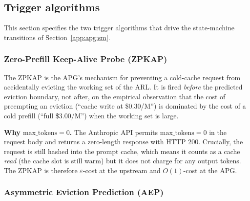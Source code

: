 \subsection{Trigger algorithms}
\label{app:apg:triggers}

This section specifies the two trigger algorithms that drive the
state-machine transitions of Section~\ref{app:apg:sm}.

\subsubsection{Zero-Prefill Keep-Alive Probe (ZPKAP)}
\label{app:apg:zpkap}

The ZPKAP is the APG's mechanism for preventing a cold-cache request
from accidentally evicting the working set of the ARL. It is fired
\emph{before} the predicted eviction boundary, not after, on the
empirical observation that the cost of preempting an eviction
(``cache write at \$0.30/M'') is dominated by the cost of a cold
prefill (``full \$3.00/M'') when the working set is large.

\begin{algorithm}[ht]
\caption{Zero-Prefill Keep-Alive Probe.}
\label{alg:zpkap}
\SetAlgoLined
{}

\BlankLine
{}
\Return{$\bot$}\;
\end{algorithm}

\noindent
\textbf{Why $\mathrm{max\_tokens} = 0$.} The Anthropic API permits
$\mathrm{max\_tokens} = 0$ in the request body and returns a
zero-length response with HTTP 200. Crucially, the request is still
hashed into the prompt cache, which means it counts as a cache
\emph{read} (the cache slot is still warm) but it does not charge
for any output tokens. The ZPKAP is therefore
$\varepsilon$-cost at the upstream and $O(1)$-cost at the APG.

\subsubsection{Asymmetric Eviction Prediction (AEP)}
\label{app:apg:aep}

